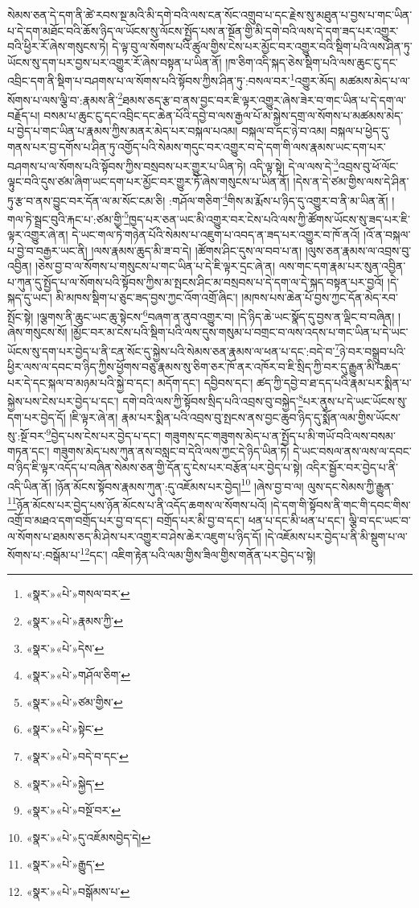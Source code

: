 སེམས་ཅན་དེ་དག་ནི་ཚེ་རབས་སྔ་མའི་མི་དགེ་བའི་ལས་ངན་སོང་འགྲུབ་པ་དང་རྗེས་སུ་མཐུན་པ་བྱས་པ་གང་ཡིན་པ་དེ་དག་མཐོང་བའི་ཆོས་ཉིད་ལ་ཡོངས་སུ་ལོངས་སྤྱོད་པས་ན་སྔོན་གྱི་མི་དགེ་བའི་ལས་དེ་དག་ཟད་པར་འགྱུར་བའི་ཕྱིར་རོ་ཞེས་གསུངས་ཏེ། དེ་ལྟ་བུ་ལ་སོགས་པའི་ཚུལ་གྱིས་ངེས་པར་མྱོང་བར་འགྱུར་བའི་སྡིག་པའི་ལས་ཤིན་ཏུ་ཡོངས་སུ་དག་པར་བྱས་པར་འགྱུར་རོ་ཞེས་བསྟན་པ་ཡིན་ནོ། །ཁ་ཅིག་འདི་སྐད་ཅེས་སྡིག་པའི་ལས་ཆུང་ངུ་དང་འབྲིང་དག་ནི་སྡིག་པ་བཤགས་པ་ལ་སོགས་པའི་སྟོབས་ཀྱིས་ཤིན་ཏུ་:བསལ་བར་\footnote{«སྣར་»«པེ་»གསལ་བར་}འགྱུར་མོད། མཚམས་མེད་པ་ལ་སོགས་པ་ལས་ལྕི་བ་:རྣམས་ནི་\footnote{«སྣར་»«པེ་»རྣམས་ཀྱི་}ཐམས་ཅད་རྩ་བ་ནས་བྱང་བར་ཇི་ལྟར་འགྱུར་ཞེས་ཟེར་བ་གང་ཡིན་པ་དེ་དག་ལ་བརྗོད་པ། བསམ་པ་ཆུང་ངུ་དང་འབྲིང་དང་ཆེན་པོའི་དབྱེ་བ་ལས་རྒྱལ་པོ་མ་སྐྱེས་དགྲ་ལ་སོགས་པ་མཚམས་མེད་པ་བྱེད་པ་གང་ཡིན་པ་རྣམས་ཀྱིས་མནར་མེད་པར་བསྐལ་པའམ། བསྐལ་བ་དང་ཉེ་བ་འམ། བསྐལ་པ་ཕྱེད་དུ་གནས་པར་བྱ་དགོས་པ་ཤིན་ཏུ་འགྱོད་པའི་སེམས་གདུང་བར་འགྱུར་བ་དེ་དག་གི་ལས་རྣམས་ཡང་དག་པར་བཤགས་པ་ལ་སོགས་པའི་སྟོབས་ཀྱིས་བསྲབས་པར་གྱུར་པ་ཡིན་ཏེ། འདི་ལྟ་སྟེ། དེ་ལ་ལས་དེ་\footnote{«སྣར་»«པེ་»དེས་}འབྲས་བུ་ཕོ་ལོང་ལྟུང་བའི་དུས་ཙམ་ཞིག་ཡང་དག་པར་མྱོང་བར་གྱུར་ཏོ་ཞེས་གསུངས་པ་ཡིན་ནོ། །དེས་ན་དེ་ཙམ་གྱིས་ལས་དེ་ཤིན་ཏུ་རྩ་བ་ནས་བྱུང་བར་དོན་ལ་མ་སོང་ངམ་ཅི། :གཤོལ་གཅིག་\footnote{«སྣར་»«པེ་»གཤོལ་ཅིག་}གིས་མ་རྨོས་པ་ཉིད་དུ་འགྱུར་བ་ནི་མ་ཡིན་ནོ། །གལ་ཏེ་སྦྲང་བུའི་རྐང་པ་:ཙམ་གྱི་\footnote{«སྣར་»«པེ་»ཙམ་གྱིས་}ཁྱད་པར་ཅན་ཡང་མི་འགྱུར་བར་ངེས་པའི་ལས་ཀྱི་ཚོགས་ཡོངས་སུ་ཟད་པར་ཇི་ལྟར་འགྱུར་ཞེ་ན། དེ་ཡང་གལ་ཏེ་གཉེན་པོའི་སེམས་པ་འཇུག་པ་འབད་ན་ཟད་པར་འགྱུར་བ་ཁོ་ནའོ། །འོ་ན་བསྐལ་པ་བྱེ་བ་བརྒྱར་ཡང་ནི། །ལས་རྣམས་ཆུད་མི་ཟ་བ་དེ། །ཚོགས་ཤིང་དུས་ལ་བབ་པ་ན། །ལུས་ཅན་རྣམས་ལ་འབྲས་བུ་འབྱིན། །ཅེས་བྱ་བ་ལ་སོགས་པ་གསུངས་པ་གང་ཡིན་པ་དེ་ཇི་ལྟར་དྲང་ཞེ་ན། ལས་གང་དག་རྣམ་པར་སུན་འབྱིན་པ་ཀུན་དུ་སྤྱོད་པ་ལ་སོགས་པའི་སྟོབས་ཀྱིས་མ་སྤངས་ཤིང་མ་བསྲབས་པ་དེ་དག་ལ་དེ་སྐད་བསྟན་པར་བྱའོ། །དེ་སྐད་དུ་ཡང་། མི་མཁས་སྡིག་པ་ཅུང་ཟད་བྱས་ཀྱང་འོག་འགྲོ་ཞིང་། །མཁས་པས་ཆེན་པོ་བྱས་ཀྱང་དོན་མེད་རབ་སྤོང་སྟེ། །ལྕགས་ནི་ཆུང་ཡང་ཆུ་སྟེངས་\footnote{«སྣར་»«པེ་»སྟེང་}བཞག་ན་ནུབ་འགྱུར་བ། །དེ་ཉིད་ཆེ་ཡང་སྣོད་དུ་བྱས་ན་ལྡིང་བ་བཞིན། །ཞེས་གསུངས་སོ། །མྱོང་བར་མ་ངེས་པའི་སྡིག་པའི་ལས་དུས་གསུམ་པ་བགྲང་བ་ལས་འདས་པ་གང་ཡིན་པ་དེ་ཡང་ཡོངས་སུ་དག་པར་བྱེད་པ་ནི་ངན་སོང་དུ་སྐྱེས་པའི་སེམས་ཅན་རྣམས་ལ་ཕན་པ་དང་:བདེ་བ་\footnote{«སྣར་»«པེ་»བདེ་བ་དང་}ཉེ་བར་བསྒྲུབ་པའི་ཕྱིར་ལས་ལ་དབང་བ་ཉིད་ཀྱིས་ཕྱོགས་བཅུ་རྣམས་སུ་ཅིག་ཅར་ཁོ་ནར་འཁོར་བ་ཇི་སྲིད་ཀྱི་བར་དུ་རྒྱུན་མི་འཆད་པར་དེ་དང་སྐལ་བ་མཉམ་པའི་སྐྱེ་བ་དང་། མདོག་དང་། དབྱིབས་དང་། ཚད་ཀྱི་དབྱེ་བ་ཐ་དད་པའི་རྣམ་པར་སྨིན་པ་སྐྱེས་པས་ངེས་པར་བྱེད་པ་དང་། དགེ་བའི་ལས་ཀྱི་སྟོབས་སྲིད་པའི་འབྲས་བུ་བསྐྱེད་\footnote{«སྣར་»«པེ་»སྐྱེད་}པར་ནུས་པ་དེ་ཡང་ཡོངས་སུ་དག་པར་བྱེད་དོ། །ཇི་ལྟར་ཞེ་ན། རྣམ་པར་སྨིན་པའི་འབྲས་བུ་སྤངས་ནས་བྱང་ཆུབ་ཉིད་དུ་སྨོན་ལམ་གྱིས་ཡོངས་སུ་:སྔོ་བར་\footnote{«སྣར་»«པེ་»བསྔོ་བར་}བྱེད་པས་ངེས་པར་བྱེད་པ་དང་། གཟུགས་དང་གཟུགས་མེད་པ་ན་སྤྱོད་པ་མི་གཡོ་བའི་ལས་བསམ་གཏན་དང་། གཟུགས་མེད་པས་ཀུན་ནས་བསླང་བ་དེའི་ལས་ཀྱང་དེ་ཉིད་ཡིན་ཏེ། དེ་ཡང་བསལ་ནས་ལས་ལ་དབང་བ་ཉིད་ཇི་ལྟར་འདོད་པ་བཞིན་སེམས་ཅན་གྱི་དོན་དུ་ངེས་པར་བརྩོན་པར་བྱེད་པ་སྟེ། འདིར་སྦྱོར་བར་བྱེད་པ་ནི་འདི་ཡིན་ནོ། །ཉོན་མོངས་སྟོབས་རྣམས་ཀུན་:དུ་འཇོམས་པར་བྱེད།\footnote{«སྣར་»«པེ་»དུ་འཇོམསབྱེད་དེ།} །ཞེས་བྱ་བ་ལ། ལུས་དང་སེམས་ཀྱི་རྒྱུན་\footnote{«སྣར་»«པེ་»རྒྱུད་}ཉོན་མོངས་པར་བྱེད་པས་ཉོན་མོངས་པ་ནི་འདོད་ཆགས་ལ་སོགས་པའོ། །དེ་དག་གི་སྟོབས་ནི་གང་གི་དབང་གིས་འགྲོ་བ་མཐའ་དག་བགྲོད་པར་བྱ་བ་དང་། བགྲོད་པར་མི་བྱ་བ་དང་། ཕན་པ་དང་མི་ཕན་པ་དང་། ལྕི་བ་དང་ཡང་བ་ལ་སོགས་པ་ཐམས་ཅད་མི་ཤེས་པར་འགྱུར་བ་ཤེས་ཆེར་འཇུག་པ་ཉིད་དོ། །དེ་འཇོམས་པར་བྱེད་པ་ནི་མི་སྡུག་པ་ལ་སོགས་པ་:བསྒོམ་པ་\footnote{«སྣར་»«པེ་»བསྒོམས་པ་}དང་། འཇིག་རྟེན་པའི་ལམ་གྱིས་ཟིལ་གྱིས་གནོན་པར་བྱེད་པ་སྟེ། 